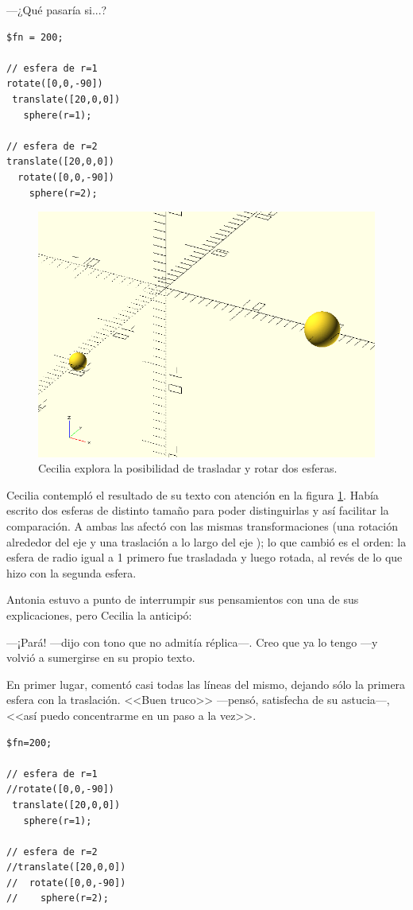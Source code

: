   ---¿Qué pasaría si...?

    \begin{lstlisting}
$fn = 200;

// esfera de r=1
rotate([0,0,-90])
 translate([20,0,0])
   sphere(r=1);
   
// esfera de r=2
translate([20,0,0])
  rotate([0,0,-90])
    sphere(r=2);
    \end{lstlisting}%


    \begin{figure}[ht]
      \centering
      \includegraphics[width=.4\textwidth]{imagenes/esferas-rotadas}      
      \caption{Cecilia explora la posibilidad de trasladar y rotar dos esferas.}
      \label{fig:esferas-rotadas}
    \end{figure}

    Cecilia contempló el resultado de su texto con atención en la
    figura \ref{fig:esferas-rotadas}. Había escrito dos esferas de
    distinto tamaño para poder distinguirlas y así facilitar la
    comparación. A ambas las afectó con las mismas transformaciones
    (una rotación alrededor del eje  y una traslación a lo
    largo del eje ); lo que cambió es el orden: la esfera de
    radio igual a 1 primero fue trasladada y luego rotada, al revés de
    lo que hizo con la segunda esfera.

  Antonia estuvo a punto de interrumpir sus pensamientos con una de
  sus explicaciones, pero Cecilia la anticipó:

  ---¡Pará!  ---dijo con tono que no admitía réplica---. Creo que ya
  lo tengo ---y volvió a sumergirse en su propio texto.

  En primer lugar, comentó casi todas las líneas del mismo, dejando
  sólo la primera esfera con la traslación. <<Buen truco>> ---pensó,
  satisfecha de su astucia---, <<así puedo concentrarme en un paso a
  la vez>>.

    \begin{lstlisting}
$fn=200;
      
// esfera de r=1
//rotate([0,0,-90])
 translate([20,0,0])
   sphere(r=1);
   
// esfera de r=2
//translate([20,0,0])
//  rotate([0,0,-90])
//    sphere(r=2);
    \end{lstlisting}%

